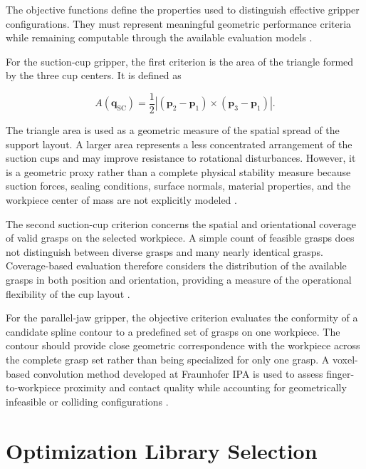 The objective functions define the properties used to distinguish effective gripper configurations. They must represent meaningful geometric
performance criteria while remaining computable through the available evaluation models \cite{Todescato,Wolniakowski2017Task}.

For the suction-cup gripper, the first criterion is the area of the triangle formed by the three cup centers. It is defined as

\begin{equation}
    A(\mathbf{q}_{\mathrm{SC}})
    =
    \frac{1}{2}
    \left|
        (\mathbf{p}_2-\mathbf{p}_1)
        \times
        (\mathbf{p}_3-\mathbf{p}_1)
    \right|.
\end{equation}

The triangle area is used as a geometric measure of the spatial spread of the support layout. A larger area represents a less concentrated arrangement
of the suction cups and may improve resistance to rotational disturbances. However, it is a geometric proxy rather than a complete physical stability
measure because suction forces, sealing conditions, surface normals, material properties, and the workpiece center of mass are not explicitly modeled
\cite{madan2022realrobotchallenge2021}.

The second suction-cup criterion concerns the spatial and orientational coverage of valid grasps on the selected workpiece. A simple count of feasible
grasps does not distinguish between diverse grasps and many nearly identical grasps. Coverage-based evaluation therefore considers the distribution of
the available grasps in both position and orientation, providing a measure of the operational flexibility of the cup layout
\cite{Bo2023A,Pinskier2024Diversity-Based}.

For the parallel-jaw gripper, the objective criterion evaluates the conformity of a candidate spline contour to a predefined set of grasps on one
workpiece. The contour should provide close geometric correspondence with the workpiece across the complete grasp set rather than being specialized
for only one grasp. A voxel-based convolution method developed at Fraunhofer IPA is used to assess finger-to-workpiece proximity and contact quality
while accounting for geometrically infeasible or colliding configurations \cite{Ko2020A,snuggle_pack}.

\section{Optimization Library Selection}
\label{sec:methodology_library}


